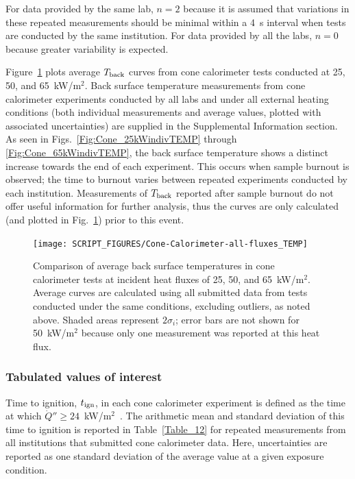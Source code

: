 \documentclass{book}
\begin{document}
For data provided by the same lab, $n=2$ because it is assumed that variations in these repeated measurements should be minimal within a 4~s interval when tests are conducted by the same institution. For data provided by all the labs, $n=0$ because greater variability is expected.

Figure~\ref{Fig:Cone-Calorimeter-all-fluxes_TEMP} plots average $T_{\rm back}$ curves from cone calorimeter tests conducted at 25, 50, and 65~kW/m$^2$. Back surface temperature measurements from cone calorimeter experiments conducted by all labs and under all external heating conditions (both individual measurements and average values, plotted with associated uncertainties) are supplied in the Supplemental Information section. As seen in Figs.~\ref{Fig:Cone_25kWindivTEMP} through \ref{Fig:Cone_65kWindivTEMP}, the back surface temperature shows a distinct increase towards the end of each experiment. This occurs when sample burnout is observed; the time to burnout varies between repeated experiments conducted by each institution. Measurements of $T_{\rm back}$ reported after sample burnout do not offer useful information for further analysis, thus the curves are only calculated (and plotted in Fig.~\ref{Fig:Cone-Calorimeter-all-fluxes_TEMP}) prior to this event.

\newpage
\begin{figure}
  \centering
  \texttt{[image: SCRIPT\_FIGURES/Cone-Calorimeter-all-fluxes\_TEMP]}
  \caption{Comparison of average back surface temperatures in cone calorimeter tests at incident heat fluxes of 25, 50, and 65~kW/m$^2$. Average curves are calculated using all submitted data from tests conducted under the same conditions, excluding outliers, as noted above. Shaded areas represent $2\sigma_i$; error bars are not shown for 50~kW/m$^2$ because only one measurement was reported at this heat flux.}
  \label{Fig:Cone-Calorimeter-all-fluxes_TEMP}
\end{figure}


\subsubsection{Tabulated values of interest}

Time to ignition, $t_{\rm ign}$, in each cone calorimeter experiment is defined as the time at which $\dot{Q}'' \ge 24$~kW/m$^2$~\cite{lyon2007criteria}. The arithmetic mean and standard deviation of this time to ignition is reported in Table~\ref{Table_12} for repeated measurements from all institutions that submitted cone calorimeter data. Here, uncertainties are reported as one standard deviation of the average value at a given exposure condition.
\end{document}
